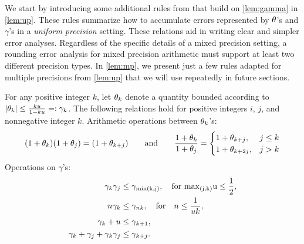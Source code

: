We start by introducing some additional rules from \cite{Higham2002} that build on \cref{lem:gamma} in \cref{lem:up}. 
These rules summarize how to accumulate errors represented by $\theta$'s and $\gamma$'s in a \emph{uniform precision} setting.
These relations aid in writing clear and simpler error analyses.
Regardless of the specific details of a mixed precision setting, a rounding error analysis for mixed precision arithmetic must support at least two different precision types. 
In \cref{lem:mp}, we present just a few rules adapted for multiple precisions from \cref{lem:up} that we will use repeatedly in future sections. 
\begin{lemma}
	\label{lem:up}
	For any positive integer $k$, let $\theta_{k}$ denote a quantity bounded according to $|\theta_{k}|\leq \frac{k u }{1-ku} =:\gamma_{k}$. The following relations hold for positive integers $i$, $j$, and nonnegative integer $k$.
	Arithmetic operations between $\theta_{k}$'s: 
	\begin{equation}
	(1+\theta_{k})(1+\theta_{j})
	=(1+\theta_{k+j}) 
	\qquad \mbox{and} \qquad
	\frac{1+\theta_{k}}{1+\theta_{j}} 
	=
	\begin{cases}
	1+\theta_{k+j},& j \leq k\\
	1+\theta_{k+2j},& j > k\\
	\end{cases} 
	\end{equation}
	Operations on $\gamma$'s: 
	\begin{align*}
	\gamma_{k}\gamma_{j} &\leq \gamma_{\rm{min}(k,j)}, \quad\text{for } \rm{max}_{(j,k)} u \leq \frac{1}{2}, \\
	n\gamma_{k} &\leq \gamma_{nk}, \quad \mbox{for} \quad n \leq \frac{1}{uk},\\
	\gamma_{k} + u &\leq \gamma_{k+1}, \\ 
	\gamma_{k}+\gamma_{j}+\gamma_{k}\gamma_{j} & \leq \gamma_{k+j}.
	\end{align*}
\end{lemma}
